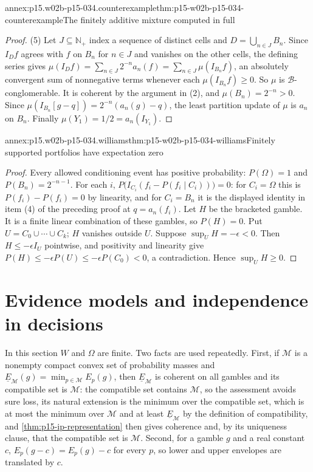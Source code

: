 \begin{annexitem}{annex:p15.w02b-p15-034.counterexample}{thm:p15-w02b-p15-034-counterexample}{The finitely additive mixture computed in full}
\begin{proof}
(5) Let \(J\subseteq\mathbb N_+\) index a sequence of distinct cells and
\(D=\bigcup_{n\in J}B_n\). Since \(I_Df\) agrees with \(f\) on \(B_n\) for
\(n\in J\) and vanishes on the other cells, the defining series gives
\(\mu(I_Df)=\sum_{n\in J}2^{-n}a_n(f)=\sum_{n\in J}\mu(I_{B_n}f)\), an
absolutely convergent sum of nonnegative terms whenever each
\(\mu(I_{B_n}f)\geq0\). So \(\mu\) is \(\mathcal B\)-conglomerable. It is
coherent by the argument in (2), and \(\mu(B_n)=2^{-n}>0\). Since
\(\mu(I_{B_n}[g-q])=2^{-n}(a_n(g)-q)\), the least partition update of
\(\mu\) is \(a_n\) on \(B_n\). Finally \(\mu(Y_1)=1/2=a_n(I_{Y_1})\).
\end{proof}
\end{annexitem}

\begin{annexitem}{annex:p15.w02b-p15-034.williams}{thm:p15-w02b-p15-034-williams}{Finitely supported portfolios have expectation zero}
\begin{proof}
Every allowed conditioning event has positive probability:
\(P(\Omega)=1\) and \(P(B_n)=2^{-n-1}\). For each \(i\),
\(P\bigl(I_{C_i}(f_i-P(f_i\mid C_i))\bigr)=0\): for \(C_i=\Omega\) this is
\(P(f_i)-P(f_i)=0\) by linearity, and for \(C_i=B_n\) it is the displayed
identity in item (4) of the preceding proof at \(q=a_n(f_i)\). Let \(H\) be
the bracketed gamble. It is a finite linear combination of these gambles,
so \(P(H)=0\). Put \(U=C_0\cup\cdots\cup C_k\); \(H\) vanishes outside
\(U\). Suppose \(\sup_UH=-\epsilon<0\). Then \(H\leq-\epsilon I_U\)
pointwise, and positivity and linearity give
\(P(H)\leq-\epsilon P(U)\leq-\epsilon P(C_0)<0\), a contradiction. Hence
\(\sup_UH\geq0\).
\end{proof}
\end{annexitem}

\section{Evidence models and independence in decisions}
\label{sec:annex-p15-w02b-p15-034-evidence-independence}

In this section \(W\) and \(\Omega\) are finite. Two facts are used
repeatedly. First, if \(\mathcal M\) is a nonempty compact convex set of
probability masses and \(\underline E_{\mathcal M}(g)=\min_{p\in\mathcal
M}E_p(g)\), then \(\underline E_{\mathcal M}\) is coherent on all gambles
and its compatible set is \(\mathcal M\): the compatible set contains
\(\mathcal M\), so the assessment avoids sure loss, its natural extension is
the minimum over the compatible set, which is at most the minimum over
\(\mathcal M\) and at least \(\underline E_{\mathcal M}\) by the definition
of compatibility, and \cref{thm:p15-ip-representation} then gives
coherence and, by its uniqueness clause, that the compatible set is
\(\mathcal M\). Second, for a gamble \(g\) and a real constant \(c\),
\(E_p(g-c)=E_p(g)-c\) for every \(p\), so lower and upper envelopes are
translated by \(c\).

